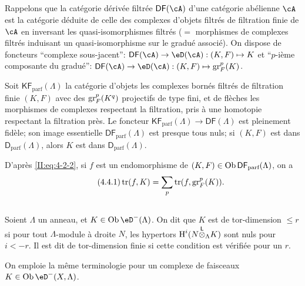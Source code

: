 \subsection{}\label{II:4-4}

Rappelons que la catégorie dérivée filtrée $\mathsf{DF}(\cA)$ d'une catégorie 
abélienne $\cA$ est la catégorie déduite de celle des complexes d'objets 
filtrés de filtration finie de $\cA$ en inversant les quasi-isomorphismes 
filtrés ($=$ morphismes de complexes filtrés induisant un quasi-isomorphisme 
sur le gradué associé). On dispose de foncteurs ``complexe sous-jacent'': 
$\mathsf{DF}(\cA)\to\eD(\cA): (K,F)\mapsto K$ et ``$p$-ième composante du 
gradué'': $\mathsf{DF}(\cA)\to\eD(\cA): (K,F)\mapsto \gr_F^p(K)$. 

Soit $\mathsf{KF}_\text{parf}(\Lambda)$ la catégorie d'objets les complexes 
bornés filtrés de filtration finie $(K,F)$ avec des $\operatorname{gr}_F^p(K^q)$ projectifs 
de type fini, et de flèches les morphismes de complexes respectant la 
filtration, pris à une homotopie respectant la filtration près. Le foncteur 
$\mathsf{KF}_\text{parf}(\Lambda)\to\mathsf{DF}(\Lambda)$ est pleinement fidèle; 
son image essentielle $\mathsf{DF}_\text{parf}(\Lambda)$ est presque tous nuls; 
si $(K,F)$ est dans $\mathsf{D}_\text{parf}(\Lambda)$, alors $K$ est dans 
$\mathsf{D}_\text{parf}(\Lambda)$. 

D'après \eqref{II:eq:4-2-2}, si $f$ est un endomorphisme de 
$(K,F)\in\operatorname{Ob}\mathsf{DF}_\text{parf}(\Lambda)$, on a 
\begin{equation*}\tag{4.4.1}\label{II:eq:4-4-1}
 \operatorname{tr}(f,K) = \sum_p \operatorname{tr}(f,\operatorname{gr}_F^p(K)) \text{.}
\end{equation*}





\subsection{}\label{II:4-5}

Soient $\Lambda$ un anneau, et $K\in\ob\eD^-(\Lambda)$. On dit que $K$ est de 
tor-dimension $\leqslant r$ si pour tout $\Lambda$-module à droite $N$, les 
hypertors $\operatorname{H}^i(N{\overset{\mathsf{L}}{\otimes}}_\Lambda K)$ sont nuls pour $i<-r$. Il est dit de 
tor-dimension finie si cette condition est vérifiée pour un $r$. 

On emploie la même terminologie pour un complexe de faisceaux 
$K\in\ob\eD^-(X,\Lambda)$. 





